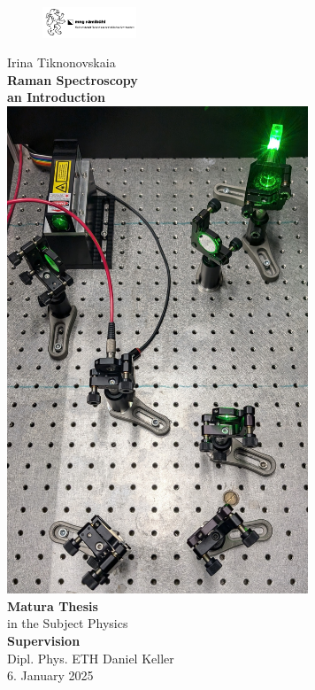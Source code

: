 \documentclass[a4paper]{article}
\date{November 2024}
\begin{document}

\begin{figure}
    \includegraphics[width=0.25\textwidth]{images/MNG_pic.png}
\end{figure}
\begin{center}
    \large
    Irina Tiknonovskaia\\
    \Huge \textbf{Raman Spectroscopy}\\
    \huge \textbf{an Introduction}
    \\[0.4cm]
    \includegraphics[width=9cm]{images/active_setup_photo.jpg}
    \\[0.4cm]
    \large
    \textbf{Matura Thesis}\\
    in the Subject Physics
    \\[0.25cm]
    \textbf{Supervision}\\
    Dipl. Phys. ETH Daniel Keller\\
    6. January 2025
\end{center}
\newpage
{}
\end{document}
